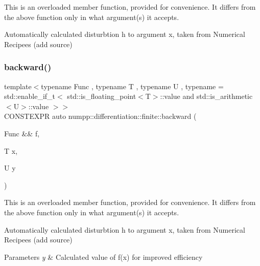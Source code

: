 This is an overloaded member function, provided for convenience. It differs from the above function only in what argument(s) it accepts.

Automatically calculated disturbtion h to argument x, taken from Numerical Recipees (add source)\mbox{\label{group__numpp__differentiation__finite__backward_ga33f8373a02912cf6b680d0d8955bea3a}} 
\subsubsection{\texorpdfstring{backward()}{backward()}\hspace{0.1cm}{\footnotesize\ttfamily [2/3]}}
{\footnotesize\ttfamily template$<$typename Func , typename T , typename U , typename  = std\+::enable\+\_\+if\+\_\+t$<$      std\+::is\+\_\+floating\+\_\+point$<$\+T$>$\+::value and      std\+::is\+\_\+arithmetic$<$\+U$>$\+::value    $>$$>$ \\
C\+O\+N\+S\+T\+E\+X\+PR auto numpp\+::differentiation\+::finite\+::backward (\begin{DoxyParamCaption}\item[{Func \&\&}]{f,  }\item[{T}]{x,  }\item[{U}]{y }\end{DoxyParamCaption})}

This is an overloaded member function, provided for convenience. It differs from the above function only in what argument(s) it accepts.

Automatically calculated disturbtion h to argument x, taken from Numerical Recipees (add source) 
\begin{DoxyParams}{Parameters}
{\em y} & Calculated value of f(x) for improved efficiency\\
\hline
\end{DoxyParams}
\mbox{\label{group__numpp__differentiation__finite__backward_ga3015b47eec3f468c07e5d72e88ea22dc}} 
